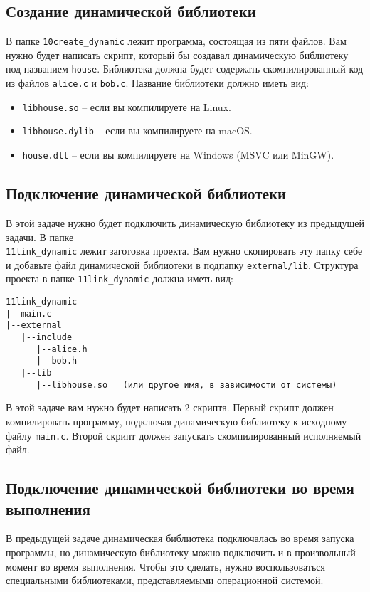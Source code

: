 \documentclass{article}
\begin{document}
\subsection{Создание динамической библиотеки}
В папке \texttt{10create\_dynamic} лежит программа, состоящая из пяти файлов. Вам нужно будет написать скрипт, который бы создавал динамическую библиотеку под названием \texttt{house}. Библиотека должна будет содержать скомпилированный код из файлов \texttt{alice.c} и \texttt{bob.c}. Название библиотеки должно иметь вид:
\begin{itemize}
\item \texttt{libhouse.so} -- если вы компилируете на Linux.
\item \texttt{libhouse.dylib} -- если вы компилируете на macOS.
\item \texttt{house.dll} -- если вы компилируете на Windows (MSVC или MinGW).
\end{itemize}

\subsection{Подключение динамической библиотеки}
В этой задаче нужно будет подключить динамическую библиотеку из предыдущей задачи. В папке\\
\texttt{11link\_dynamic} лежит заготовка проекта. Вам нужно скопировать эту папку себе и добавьте файл динамической библиотеки в подпапку \texttt{external/lib}. Структура проекта в папке \texttt{11link\_dynamic} должна иметь вид:
\begin{verbatim}
11link_dynamic
|--main.c
|--external
   |--include
      |--alice.h
      |--bob.h
   |--lib
      |--libhouse.so   (или другое имя, в зависимости от системы)
\end{verbatim}
В этой задаче вам нужно будет написать 2 скрипта. Первый скрипт должен компилировать программу, подключая динамическую библиотеку к исходному файлу \texttt{main.c}. Второй скрипт должен запускать скомпилированный исполняемый файл.

\subsection{Подключение динамической библиотеки во время выполнения}
В предыдущей задаче динамическая библиотека подключалась во время запуска программы, но динамическую библиотеку можно подключить и в произвольный момент во время выполнения. Чтобы это сделать, нужно воспользоваться специальными библиотеками, представляемыми операционной системой.
\end{document}
